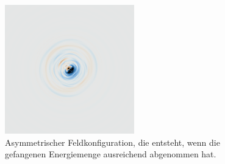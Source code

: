 \begin{figure}
    \begin{center}
        \includegraphics[width=0.5\textwidth]{papers/particles/figures/simulations/particle_frames/frame_12.png}
        \caption{Asymmetrischer Feldkonfiguration, die entsteht, wenn die gefangenen Energiemenge ausreichend abgenommen hat.\ }\label{particles:fig:partikel:abnehmen:asymmetrisch}
    \end{center}
\end{figure}